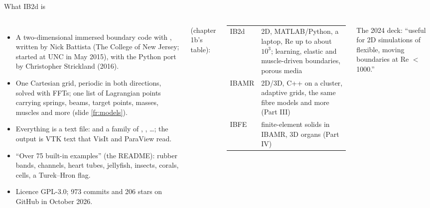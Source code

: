 \documentclass[aspectratio=169,11pt]{beamer}
\begin{document}
\begin{frame}{What IB2d is}
\label{fr:what}
\begin{columns}[T]
\footnotesize
\begin{itemize}
  \item A two-dimensional immersed boundary code with , written by Nick Battista (The College of New Jersey; started at UNC in May 2015), with the Python port by Christopher Strickland (2016).
  \item One Cartesian grid, periodic in both directions, solved with FFTs; one list of Lagrangian points carrying springs, beams, target points, masses, muscles and more (slide \ref{fr:models}).
  \item Everything is a text file:  and a family of , , \ldots; the output is VTK text that VisIt and ParaView read.
  \item ``Over 75 built-in examples'' (the README): rubber bands, channels, heart tubes, jellyfish, insects, corals, cells, a Turek--Hron flag.
  \item Licence GPL-3.0; 973 commits and 206 stars on GitHub in October 2026.
\end{itemize}
\scriptsize
{} (chapter 1b's table):

\vspace{1mm}
\begin{tabular}{@{}L{0.26\textwidth}L{0.62\textwidth}@{}}
\toprule
IB2d & 2D, MATLAB/Python, a laptop, Re up to about $10^3$; learning, elastic and muscle-driven boundaries, porous media \\
IBAMR & 2D/3D, C++ on a cluster, adaptive grids, the same fibre models and more (Part III) \\
IBFE & finite-element solids in IBAMR, 3D organs (Part IV) \\
\bottomrule
\end{tabular}

\vspace{2mm}
The 2024 deck: ``useful for 2D simulations of flexible, moving boundaries at Re $<$ 1000.''
\end{columns}
\end{frame}
\end{document}
